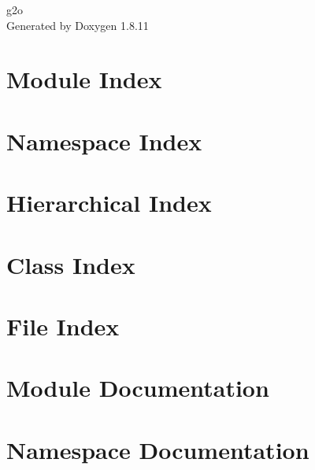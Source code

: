 \documentclass[twoside]{book}
\newcommand{\+}{\discretionary{\mbox{\scriptsize$\hookleftarrow$}}{}{}}
\newcommand{\clearemptydoublepage}{%
  \newpage{\pagestyle{empty}\cleardoublepage}%
}
\begin{document}
\hypersetup{pageanchor=false,
             bookmarksnumbered=true,
             pdfencoding=unicode
            }
\begin{titlepage}
\vspace*{7cm}
\begin{center}%
{\Large g2o }\\
\vspace*{1cm}
{\large Generated by Doxygen 1.8.11}\\
\end{center}
\end{titlepage}
\clearemptydoublepage
\tableofcontents
\clearemptydoublepage
{}
\hypersetup{pageanchor=true}

\chapter{Module Index}

\chapter{Namespace Index}

\chapter{Hierarchical Index}

\chapter{Class Index}

\chapter{File Index}

\chapter{Module Documentation}



\chapter{Namespace Documentation}




\end{document}
